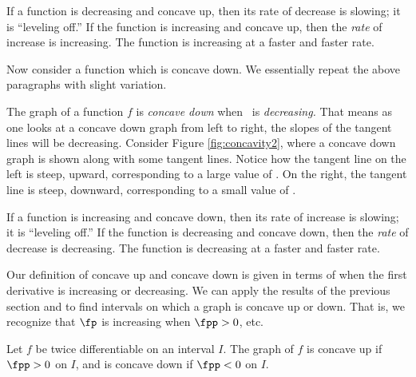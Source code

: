 If a function is decreasing and concave up, then its rate of decrease is slowing; it is ``leveling off.''  If the  function is increasing and concave up, then the \textit{rate} of increase is increasing.  The function is increasing at a faster and faster rate.

Now consider a function which is concave down. We essentially repeat the above paragraphs with slight variation.

The graph of a function $f$ is \textit{concave down}  when \fp\ is \textit{decreasing.} That means as one looks at a concave down graph from left to right, the slopes of the tangent lines will be decreasing. Consider Figure \ref{fig:concavity2}, where a concave down graph is shown along with some tangent lines. Notice how the tangent line on the left is  steep, upward, corresponding to a large value of \fp. On the right, the tangent line is steep, downward, corresponding to a small value of \fp.%

\enlargethispage{\baselineskip}

If a function is increasing and concave down, then its rate of increase is slowing; it is ``leveling off.''  If the function is decreasing and concave down, then the \textit{rate} of decrease is decreasing.  The function is decreasing at a faster and faster rate.


Our definition of concave up and concave down is given in terms of when the first derivative is increasing or decreasing. We can apply the results of the previous section and to find intervals on which a graph is concave up or down. That is, we recognize that $\fp$ is increasing when $\fpp>0$, etc. 

%
{Let $f$ be twice differentiable on an interval $I$. The graph of $f$ is concave up if $\fpp>0$ on $I$, and is concave down if $\fpp<0$ on $I$. 
}


